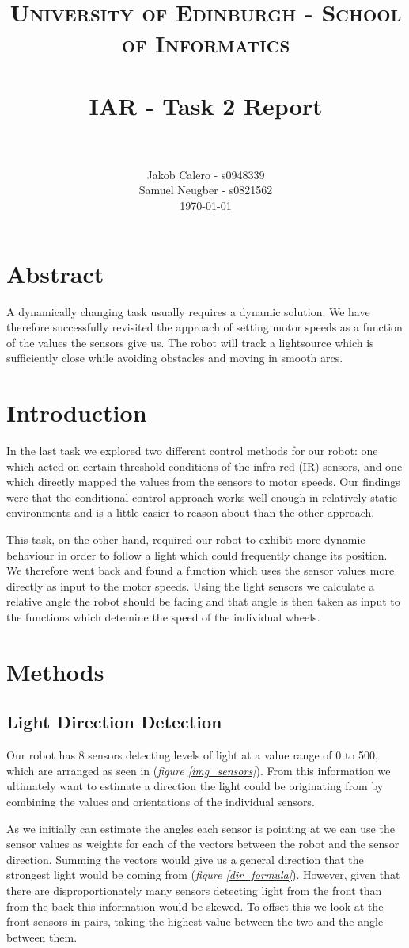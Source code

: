 \documentclass[paper=a4, fontsize=12pt]{scrartcl}	%
\title{
\vspace{-1in} 	
\usefont{OT1}{bch}{b}{n}
\normalfont \normalsize \textsc{University of Edinburgh - School of Informatics}
\\ [25pt]
\horrule{0.5pt} \\[0.4cm]
\large IAR - Task 2 Report \\
\horrule{1pt} \\[0.5cm]
}
\author{
  \normalfont \normalsize
  Jakob Calero - s0948339\\[-3pt]\normalsize
  Samuel Neugber - s0821562\\[-3pt]\normalsize
  \today
}
\date{}
\numberwithin{equation}{section}		%
\numberwithin{figure}{section}			%
\numberwithin{table}{section}				%
\begin{document}
\maketitle					%
\section{Abstract}
A dynamically changing task usually requires a dynamic solution. We have therefore successfully revisited the approach of setting motor speeds as a function of the values the sensors give us. The robot will track a lightsource which is sufficiently close while avoiding obstacles and moving in smooth arcs.


\section{Introduction}
In the last task we explored two different control methods for our robot: one which acted on certain threshold-conditions of the infra-red (IR) sensors, and one which directly mapped the values from the sensors to motor speeds. Our findings were that the conditional control approach works well enough in relatively static environments and is a little easier to reason about than the other approach.

This task, on the other hand, required our robot to exhibit more dynamic behaviour in order to follow a light which could frequently change its position. We therefore went back and found a function which uses the sensor values more directly as input to the motor speeds. Using the light sensors we calculate a relative angle the robot should be facing and that angle is then taken as input to the functions which detemine the speed of the individual wheels.

\section{Methods} 
\subsection{Light Direction Detection}
\label{LDD}
Our robot has 8 sensors detecting levels of light at a value range of 0 to 500, which are arranged as seen in (\emph{figure \ref{img_sensors}}). From this information we ultimately want to estimate a direction the light could be originating from by combining the values and orientations of the individual sensors.

As we initially can estimate the angles each sensor is pointing at we can use the sensor values as weights for each of the vectors between the robot and the sensor direction. Summing the vectors would give us a general direction that the strongest light would be coming from (\emph{figure \ref{dir_formula}}). However, given that there are disproportionately many sensors detecting light from the front than from the back this information would be skewed. To offset this we look at the front sensors in pairs, taking the highest value between the two and the angle between them.
\end{document}
